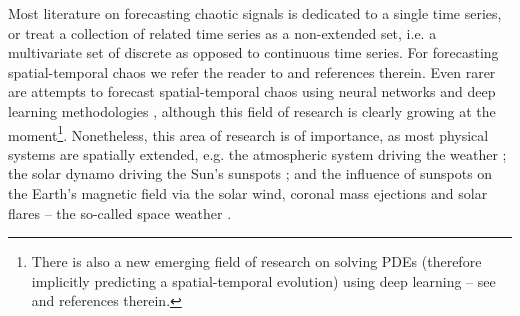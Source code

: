 \documentclass[journal]{IEEEtran}
\begin{document}
Most literature on forecasting chaotic signals is dedicated to a single time series, or treat a collection of related time series as a 
non-extended set, i.e. a multivariate set of discrete as opposed to continuous time series. For forecasting spatial-temporal chaos we 
refer the reader to 
\cite{doi:10.1063/1.165894,PhysRevE.51.R2709,PhysRevLett.85.2300,
Parlitz2000NonlinearPO,2000PhRvL..84.1890P,Xia2006APF,ENV:ENV2266,covas2016,ENV:ENV2456} and 
references therein. Even rarer are attempts to forecast spatial-temporal chaos using neural networks and deep learning methodologies 
\cite{covaspeixinhojoao,2017arXiv170805094M,2017arXiv171100636M,2017arXiv171110566R,2017arXiv171110561R,2017arXiv171009668L, 
2017arXiv171205293C, ghaderi2017deepforecast,2017Chaos..27d1102L,
2018JCoPh.357..125R,2018arXiv180106637R}, although this field of research is clearly growing at the moment\footnote{
There is also a new emerging field of research on solving PDEs (therefore implicitly predicting a spatial-temporal
evolution) using deep learning -- see \cite{2017arXiv170905963B,2017arXiv170807469S,2017arXiv170604702E} and references therein.}.
 Nonetheless, this area of 
research is of importance, as most physical systems are spatially extended, e.g. the atmospheric system driving the weather 
\cite{9780521857291}; the solar dynamo driving the Sun's sunspots \cite{9780198512905}; and the influence of sunspots on the Earth's 
magnetic field via the solar wind, coronal mass ejections and solar flares -- the so-called space weather 
\cite{1851RSPT..141..123S, 1852RSPT..142..103S, 1979P&SS...27.1001S,
1983SoPh...89..195E,1965P&SS...13....9P,2000AdSpR..26...27W,2003A&AT...22..861B,2005GeoRL..3221106S,
2005SpWea...3.8C01K,2006GMS...165..367T,2006GeoRL..3318101H, 2009SunGe...4...55C,2011SpWea...9.6001C,
2013EGUGA..1510865W,2015SpWea..13..524S}.
\end{document}
